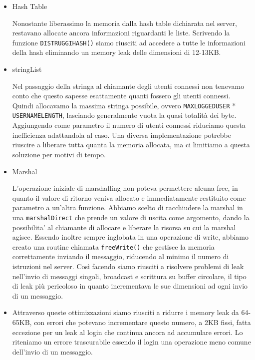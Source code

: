 \documentclass[a4paper, 11pt]{article} %
\begin{document}
\begin{itemize}
	\item Hash Table\\
	\footnotesize
	
	\normalsize
	Nonostante liberassimo la memoria dalla hash table dichiarata nel server, restavano allocate ancora informazioni riguardanti le liste. Scrivendo la funzione \texttt{DISTRUGGIHASH()} siamo riusciti ad accedere a tutte le informazioni della hash eliminando un memory leak delle dimensioni di 12-13KB.
	\item stringList\\
	\footnotesize
	
	\normalsize
	Nel passaggio della stringa al chiamante degli utenti connessi non tenevamo conto che questo sapesse esattamente quanti fossero gli utenti connessi. Quindi allocavamo la massima stringa possibile, ovvero \texttt{MAXLOGGEDUSER} *  \texttt{USERNAMELENGTH}, lasciando generalmente vuota la quasi totalità dei byte. Aggiungendo come parametro il numero di utenti connessi riduciamo questa inefficienza adattandola al caso. Una diversa implementazione potrebbe riuscire a liberare tutta quanta la memoria allocata, ma ci limitiamo a questa soluzione per motivi di tempo.
	\item Marshal\\
	\footnotesize
	
	
	
	\normalsize
	L'operazione iniziale di marshalling non poteva permettere alcuna free, in quanto il valore di ritorno veniva allocato e immediatamente restituito come parametro a un'altra funzione. Abbiamo scelto di racchiudere la marshal in una \texttt{marshalDirect} che prende un valore di uscita come argomento, dando la possibilita' al chiamante di allocare e liberare la risorsa su cui la marshal agisce. Essendo inoltre sempre inglobata in una operazione di write, abbiamo creato una routine chiamata \texttt{freeWrite()} che gestisce la memoria correttamente inviando il messaggio, riducendo al minimo il numero di istruzioni nel server. Così facendo siamo riusciti a risolvere problemi di leak nell'invio di messaggi singoli, broadcast e scrittura su buffer circolare, il tipo di leak più pericoloso in quanto incrementava le sue dimensioni ad ogni invio di un messaggio.
	\item
	Attraverso queste ottimizzazioni siamo riusciti a ridurre i memory leak da 64-65KB, con errori che potevano incrementare questo numero, a 2KB fissi, fatta eccezione per un leak al login che continua ancora ad accumulare errori. Lo riteniamo un errore trascurabile essendo il login una operazione meno comune dell'invio di un messaggio.
	
\end{itemize}
\end{document}
